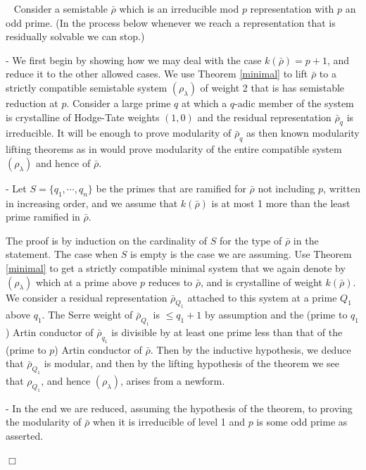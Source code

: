 \documentclass[12pt]{article}
\newcommand{\rhobar}{\overline{\rho}}
\newenvironment{proof}{\smallskip\noindent{\bf Proof.}\
}{$\Box$\smallskip\goodbreak}
\def\rhobar{ {\bar {\rho} } }
\def\rhob{ {\bar {\rho} } }
\begin{document}
\begin{proof}
Consider a semistable $\rhob$ which is an irreducible
mod $p$ representation with $p$ an odd prime. (In the process below
whenever we reach a representation that is residually solvable we can stop.)

- We first begin by showing
how we may deal with the case $k(\rhob)=p+1$, and reduce it to the other
allowed
cases. We use
Theorem \ref{minimal} to lift $\rhob$ to a strictly compatible
semistable system
$(\rho_\lambda)$ of weight 2 that is has semistable reduction at  $p$. Consider a large prime $q$ at which a $q$-adic
member of
the system is crystalline of Hodge-Tate weights $(1,0)$ and the residual
representation $\rhob_q$ is irreducible. It will
be
enough
to prove modularity
of $\rhob_q$ as then known modularity lifting theorems as in \cite{Wiles}
would prove modularity of the entire compatible system $(\rho_\lambda)$ and
hence of $\rhob$. 

- Let $S=\{q_1,\cdots,q_n\}$
be the primes that are ramified for $\rhob$ not including $p$, written
in increasing order, and we assume
that  $k(\rhob)$ is at most 1 more than the least prime ramified in
$\rhobar$.

The proof is by induction on the cardinality of $S$ for the type of
$\rhobar$
in the statement. The case when $S$ is empty is the case
we are assuming.
Use  Theorem \ref{minimal} to get a strictly compatible minimal
system that we again denote by $(\rho_\lambda)$ which at a prime above
$p$ reduces to $\rhob$, and is crystalline of weight $k(\rhob)$. We consider
a
residual representation $\rhob_{Q_1}$
attached
to this system at a prime $Q_1$ above $q_1$.
The Serre weight of
$\rhob_{Q_1}$ is $\leq q_1+1$ by assumption and the (prime to $q_1$)
Artin conductor of $\rhob_{q_1}$ is divisible by at least one prime
less than that of the (prime to $p$)
Artin conductor of $\rhob$. Then by the inductive hypothesis,
we deduce that $\rhob_{Q_1}$ is modular, and then by the lifting
hypothesis of the theorem we
see that $\rho_{Q_1}$, and hence $(\rho_\lambda)$, arises from
a newform.

- In the end we are  reduced, assuming the hypothesis of the theorem, to
proving the modularity of $\rhob$ when it is
irreducible of level 1 and $p$ is some odd prime as asserted.

\end{proof}
\end{document}
